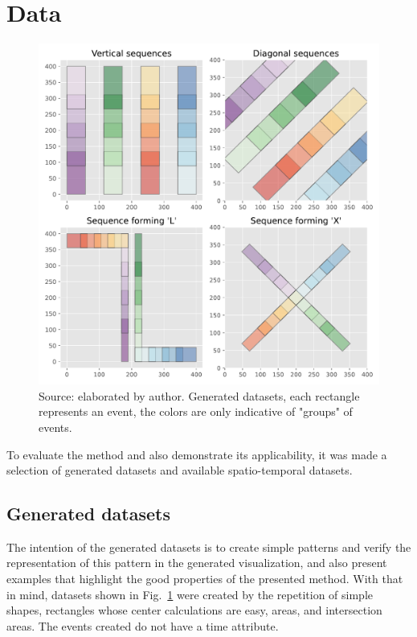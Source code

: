 \section{Data}

\begin{figure}
    \centering
    \includegraphics[width = \textwidth]{src/imgs/generated-datasets.pdf}
    \caption{Source: elaborated by author. Generated datasets, each rectangle represents an event, the colors are only indicative of "groups" of events. }
    \label{fig:generated-datasets}
\end{figure}
To evaluate the method and also demonstrate its applicability, it was made a selection of generated datasets and available spatio-temporal datasets.
%

\subsection{Generated datasets}

The intention of the generated datasets is to create simple patterns and verify the representation of this pattern in the generated visualization,
%
and also present examples that highlight the good properties of the presented method.
%
With that in mind, datasets shown in Fig.~\ref{fig:generated-datasets} were created by the repetition of simple shapes, rectangles whose center calculations are easy, areas, and intersection areas. The events created do not have a time attribute.
%


